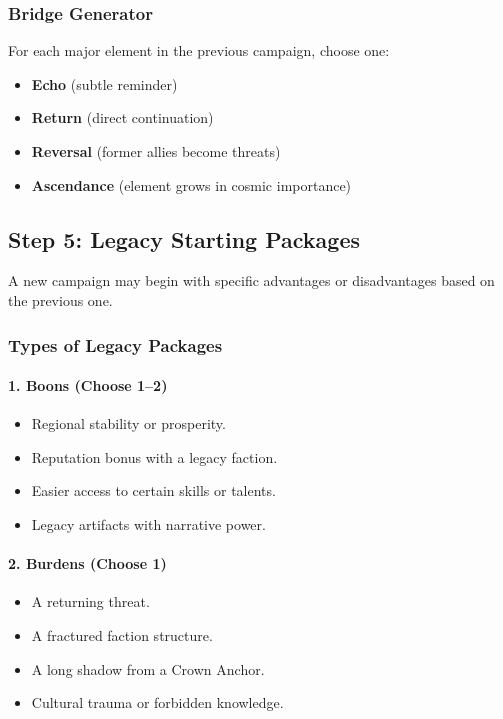 \documentclass[11pt]{article}
\begin{document}
\subsubsection{Bridge Generator}
For each major element in the previous campaign, choose one:
\begin{itemize}
    \item \textbf{Echo} (subtle reminder)
    \item \textbf{Return} (direct continuation)
    \item \textbf{Reversal} (former allies become threats)
    \item \textbf{Ascendance} (element grows in cosmic importance)
\end{itemize}

\subsection{Step 5: Legacy Starting Packages}

A new campaign may begin with specific advantages or disadvantages based on the previous one.

\subsubsection{Types of Legacy Packages}

\paragraph{1. Boons (Choose 1--2)}
\begin{itemize}
    \item Regional stability or prosperity.
    \item Reputation bonus with a legacy faction.
    \item Easier access to certain skills or talents.
    \item Legacy artifacts with narrative power.
\end{itemize}

\paragraph{2. Burdens (Choose 1)}
\begin{itemize}
    \item A returning threat.
    \item A fractured faction structure.
    \item A long shadow from a Crown Anchor.
    \item Cultural trauma or forbidden knowledge.
\end{itemize}
\end{document}
